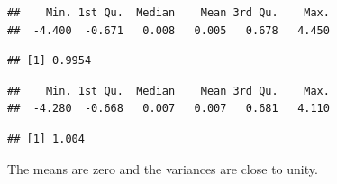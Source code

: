 \documentclass[12pt, a4paper, oneside]{article} %
\begin{document}
\begin{knitrout}
\color{fgcolor}\begin{kframe}
\begin{alltt}
\end{alltt}
\begin{verbatim}
##    Min. 1st Qu.  Median    Mean 3rd Qu.    Max. 
##  -4.400  -0.671   0.008   0.005   0.678   4.450
\end{verbatim}
\begin{alltt}
\end{alltt}
\begin{verbatim}
## [1] 0.9954
\end{verbatim}
\begin{alltt}
\end{alltt}
\begin{verbatim}
##    Min. 1st Qu.  Median    Mean 3rd Qu.    Max. 
##  -4.280  -0.668   0.007   0.007   0.681   4.110
\end{verbatim}
\begin{alltt}
\end{alltt}
\begin{verbatim}
## [1] 1.004
\end{verbatim}
\end{kframe}
\end{knitrout}
The means are zero and the variances are close  to unity. 
\end{document}

